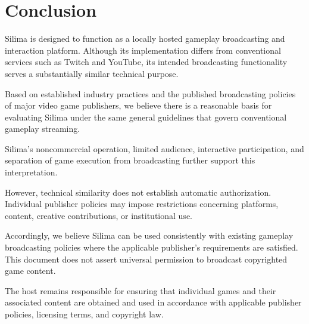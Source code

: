 \section{Conclusion}

Silima is designed to function as a locally hosted
gameplay broadcasting and interaction platform.
Although its implementation differs from conventional
services such as Twitch and YouTube, its intended
broadcasting functionality serves a substantially
similar technical purpose.

Based on established industry practices and the
published broadcasting policies of major video game
publishers, we believe there is a reasonable basis
for evaluating Silima under the same general guidelines
that govern conventional gameplay streaming.

Silima's noncommercial operation, limited audience,
interactive participation, and separation of game
execution from broadcasting further support this
interpretation.

However, technical similarity does not establish
automatic authorization. Individual publisher policies
may impose restrictions concerning platforms, content,
creative contributions, or institutional use.

Accordingly, we believe Silima can be used consistently
with existing gameplay broadcasting policies where
the applicable publisher's requirements are satisfied.
This document does not assert universal permission
to broadcast copyrighted game content.

The host remains responsible for ensuring that
individual games and their associated content are
obtained and used in accordance with applicable
publisher policies, licensing terms, and copyright law.

